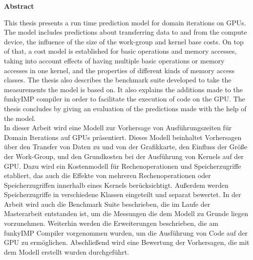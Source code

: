 

\clearemptydoublepage
{}
{}	





\vspace*{2cm}
\begin{center}
{\Large \bf Abstract}
\end{center}
\vspace{1cm}

This thesis presents a run time prediction model for domain iterations on GPUs. The model includes predictions about transferring data to and from the compute device, the influence of the size of the work-group and kernel base costs. On top of that, a cost model is established for basic operations and memory accesses, taking into account effects of having multiple basic operations or memory accesses in one kernel, and the properties of different kinds of memory access classes. The thesis also describes the benchmark suite developed to take the measurements the model is based on. It also explains the additions made to the funkyIMP compiler in order to facilitate the execution of code on the GPU. The thesis concludes by giving an evaluation of the predictions made with the help of the model. \\

In dieser Arbeit wird eine Modell zur Vorhersage von Ausführungszeiten für Domain Iterations auf GPUs präsentiert. Dieses Modell beinhaltet Vorhersagen über den Transfer von Daten zu und von der Grafikkarte, den Einfluss der Größe der Work-Group, und den Grundkosten bei der Ausführung von Kernels auf der GPU. Dazu wird ein Kostenmodell für Rechenoperationen und Speicherzugriffe etabliert, das auch die Effekte von mehreren Rechenoperationen oder Speicherzugriffen innerhalb eines Kernels berücksichtigt. Außerdem werden Speicherzugriffe in verschiedene Klassen eingeteilt und separat bewertet. In der Arbeit wird auch die Benchmark Suite beschrieben, die im Laufe der Masterarbeit entstanden ist, um die Messungen die dem Modell zu Grunde liegen vorzunehmen. Weiterhin werden die Erweiterungen beschrieben, die am funkyIMP Compiler vorgenommen wurden, um die Ausführung von Code auf der GPU zu ermöglichen. Abschließend wird eine Bewertung der Vorhersagen, die mit dem Modell erstellt wurden durchgeführt.